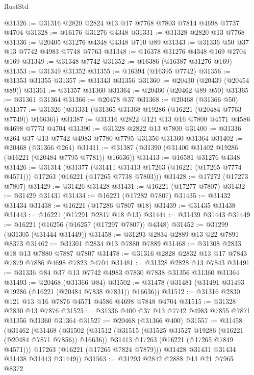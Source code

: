 \begin{lexlean}{RustStd}
\begin{coremodule}
@31326 := @31316 @2820 @2824 @13 @17 @7768 @7803 @7814 @4698 @7737 @4704
@31328 := @16176 @31276 @4348
@31331 := @31328 @2820 @13 @7768
@31336 := @20405 @31276 @4348 @4348 @710 @89
@31343 := @31336 @50 @37 @13 @7742 @4983 @7748 @7763
@31348 := @16378 @31276 @4348 @169 @2704 @169
@31349 := @31348 @7742
@31352 := @16386 (@16387 @31276 @169)
@31353 := @31349 @31352
@31355 := @16394 (@16395 @7742)
@31356 := @31353 @31355
@31357 := @31343 @31356
@31360 := @20430 (@20439 (@20454 @89))
@31361 := @31357 @31360
@31364 := @20460 (@20462 @89 @50)
@31365 := @31361 @31364
@31366 := @20478 @37
@31368 := @20468 (@31366 @50)
@31377 := @31326 (@31331 (@31365 @31368 @19286 (@16221 (@20484 @7763 @7749)) @16636))
@31387 := @31316 @2822 @121 @13 @16 @7800 @4571 @4586 @4698 @7773 @4704
@31390 := @31328 @2822 @13 @7800
@31400 := @31336 @264 @37 @13 @7742 @4983 @7780 @7795 @31356 @31360 @31364
@31402 := @20468 (@31366 @264)
@31411 := @31387 (@31390 (@31400 @31402 @19286 (@16221 (@20484 @7795 @7781)) @16636))
@31413 := @16581 @31276 @4348
@31426 := @31314
    (@31377
      (@31411 @31413 @17263 (@16221 (@17265 @7774 @4571)))
      @17263
      (@16221 (@17265 @7738 @7803)))
@31428 := @17272 (@17273 @7807)
@31429 := @31426 @31428
@31431 := @16221 (@17277 @7807)
@31432 := @31429 @31431
@31434 := @16221 (@17282 @7807)
@31435 := @31432 @31434
@31438 := @16221 (@17286 @7807 @18)
@31439 := @31435 @31438
@31443 := @16221 (@17291 @2817 @18 @13)
@31444 := @31439 @31443
@31449 := @16221 (@16256 (@16257 (@17297 @7807)) @4348)
@31452 := @31299 (@31305 (@31444 @31449))
@31458 := @31293 @2834 @2889 @13 @22 @7891 @8373
@31462 := @31301 @2834 @13 @7880 @7889
@31468 := @31308 @2833 @18 @13 @7880 @7887 @7807
@31478 := @31316 @2828 @2832 @13 @17 @7843 @7879 @7886 @4698 @7823 @4704
@31481 := @31328 @2828 @13 @7843
@31491 := @31336 @84 @37 @13 @7742 @4983 @7830 @7838 @31356 @31360 @31364
@31493 := @20468 (@31366 @84)
@31502 := @31478 (@31481 (@31491 @31493 @19286 (@16221 (@20484 @7838 @7831)) @16636))
@31512 := @31316 @2830 @121 @13 @16 @7876 @4571 @4586 @4698 @7848 @4704
@31515 := @31328 @2830 @13 @7876
@31525 := @31336 @400 @37 @13 @7742 @4983 @7855 @7871 @31356 @31360 @31364
@31527 := @20468 (@31366 @400)
@31557 := @31458
    (@31462
      (@31468
        (@31502
          (@31512
            (@31515 (@31525 @31527 @19286 (@16221 (@20484 @7871 @7856)) @16636))
            @31413
            @17263
            (@16221 (@17265 @7849 @4571)))
          @17263
          (@16221 (@17265 @7824 @7879)))
        @31428
        @31431
        @31434
        @31438
        @31443
        @31449))
@31563 := @31293 @2842 @2888 @13 @21 @7965 @8372

\end{coremodule}
\end{lexlean}
